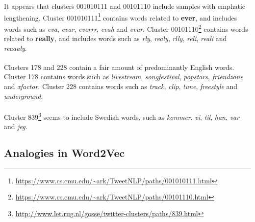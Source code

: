 \documentclass[a4paper, 11pt]{article}
\begin{document}
It appears that clusters 001010111 and 00101110 include samples with emphatic lengthening. Cluster 001010111\footnote{\url{https://www.cs.cmu.edu/~ark/TweetNLP/paths/001010111.html}} contains words related to \textbf{ever}, and includes words such as \textit{eva}, \textit{evar}, \textit{everrr}, \textit{evah} and \textit{evur}. Cluster 00101110\footnote{\url{https://www.cs.cmu.edu/~ark/TweetNLP/paths/00101110.html}} contains words related to \textbf{really}, and includes words such as \textit{rly}, \textit{realy}, \textit{rlly}, \textit{reli}, \textit{reali} and \textit{reaaaly}.\\

\noindent{}\\

Clusters 178 and 228 contain a fair amount of predominantly English words. Cluster 178 contains words such as \textit{livestream}, \textit{songfestival}, \textit{popstars}, \textit{friendzone} and \textit{xfactor}. Cluster 228 contains words such as \textit{track}, \textit{clip}, \textit{tune}, \textit{freestyle} and \textit{underground}.\\

\noindent{}\\

Cluster 839\footnote{\url{http://www.let.rug.nl/gosse/twitter-clusters/paths/839.html}} seems to include Swedish words, such as \textit{kommer}, \textit{vi}, \textit{til}, \textit{han}, \textit{var} and \textit{jeg}.



\subsection{Analogies in Word2Vec}
\end{document}
